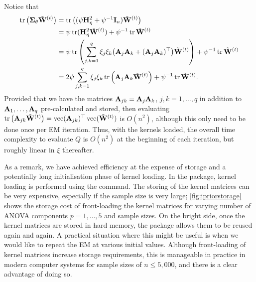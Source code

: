 Notice that
\begin{align*}
  \operatorname{tr}\big({\bm\Sigma}_\theta \tilde{\mathbf W}^{(t)}\big)
  &=  \operatorname{tr}\big( (\psi{\mathbf H}_\eta^2 + \psi^{-1}{\mathbf I}_n ) \tilde{\mathbf W}^{(t)} \big) \\
  &= \psi \operatorname{tr} ({\mathbf H}_\eta^2\tilde{\mathbf W}^{(t)}) + \psi^{-1}\operatorname{tr} \tilde{\mathbf W}^{(t)} \\
  &= \psi \operatorname{tr} \left(\sum_{j,k=1}^q \xi_j \xi_k \big({\mathbf A}_j {\mathbf A}_k + ({\mathbf A}_j {\mathbf A}_k)^\top\big)
   \tilde{\mathbf W}^{(t)}\right) + \psi^{-1}\operatorname{tr} \tilde{\mathbf W}^{(t)} \\
   &= 2\psi \sum_{j,k=1}^q \xi_j \xi_k \operatorname{tr} \left(  {\mathbf A}_j {\mathbf A}_k 
   \tilde{\mathbf W}^{(t)}\right) + \psi^{-1}\operatorname{tr} \tilde{\mathbf W}^{(t)}.
\end{align*}
Provided that we have the matrices ${\mathbf A}_{jk} = {\mathbf A}_j{\mathbf A}_k$, $j,k=1,\dots,q$ in addition to ${\mathbf A}_1,\dots,{\mathbf A}_q$ pre-calculated and stored, then evaluating $\operatorname{tr}\big({\mathbf A}_{jk} \tilde{\mathbf W}^{(t)} \big) = \operatorname{vec}({\mathbf A}_{jk})^\top \operatorname{vec}(\tilde{\mathbf W}^{(t)} )$ is $O(n^2)$, although this  only need to be done once per EM iteration.
Thus, with the kernels loaded, the overall time complexity to evaluate $Q$ is $O(n^2)$ at the beginning of each iteration, but roughly linear in $\xi$ thereafter.

As a remark, we have achieved efficiency at the expense of storage and a potentially long initialisation phase of kernel loading.
In the  package, kernel loading is performed using the  command.
The storing of the kernel matrices can be very expensive, especially if the sample size is very large; \cref{fig:ipriorstorage} shows the storage cost of front-loading the kernel matrices for varying number of ANOVA components $p=1,\dots,5$ and sample sizes.
On the bright side, once the kernel matrices are stored in hard memory, the  package allows them to be reused again and again.
A practical situation where this might be useful is when we would like to repeat the EM at various initial values.
Although front-loading of kernel matrices increase storage requirements, this is manageable in practice in modern computer systems for sample sizes of $n \leq 5,000$, and there is a clear advantage of doing so.

